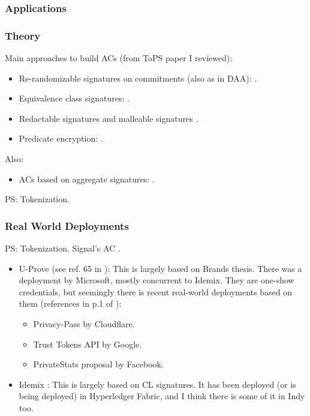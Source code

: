 \subsubsection{Applications}
\label{ssec:acapplication}

\subsubsection{Theory}
\label{sssec:actheoryapp}

Main approaches to build ACs (from ToPS paper I reviewed):

\begin{itemize}
\item Re-randomizable signatures on commitments (also as in DAA):
  \cite{cl02,cl04,lmpy16,ps16}.
\item Equivalence class signatures: \cite{fhs19,hs14}.
\item Redactable signatures \cite{cdhk15,sand20} and malleable signatures
  \cite{ckl14}.
\item Predicate encryption: \cite{dmm+18}.
\end{itemize}

Also:

\begin{itemize}
  \item ACs based on aggregate signatures: \cite{cl11}.
\end{itemize}

PS: Tokenization.

\subsubsection{Real World Deployments}
\label{sssec:acrwdeploy}

PS: Tokenization.
Signal's AC \cite{cpz20}.

\begin{itemize}
\item U-Prove (see ref. 65 in \cite{hs21}):  This is largely based on Brands
  thesis. There was a deployment by Microsoft, mostly concurrent to Idemix.
  They are one-show credentials, but seemingly there is recent real-world
  deployments based on them (references in p.1 of \cite{hs21}):
  
  \begin{itemize}
  \item Privacy-Pass by Cloudflare.
  \item Trust Tokens API by Google.
  \item PrivateStats proposal by Facebook.
  \end{itemize}
  
\item Idemix \cite{ch02}: This is largely based on CL signatures. It has been
  deployed (or is being deployed) in Hyperledger Fabric, and I think there is
  some of it in Indy too.
\end{itemize}

